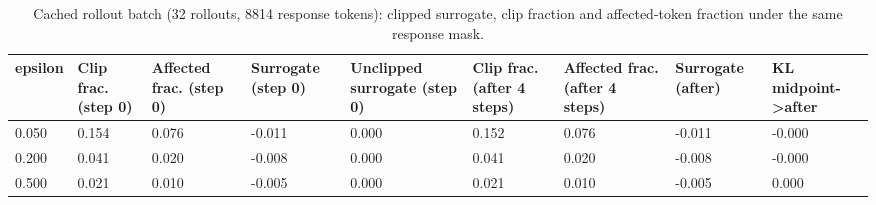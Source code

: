 \begin{table}[t]
\centering
\small
\caption{Cached rollout batch (32 rollouts, 8814 response tokens): clipped surrogate, clip fraction and affected-token fraction under the same response mask.}
\begin{tabular}{lllllllll}
\toprule
epsilon & Clip frac. (step 0) & Affected frac. (step 0) & Surrogate (step 0) & Unclipped surrogate (step 0) & Clip frac. (after 4 steps) & Affected frac. (after 4 steps) & Surrogate (after) & KL midpoint->after \\
\midrule
0.050 & 0.154 & 0.076 & -0.011 & 0.000 & 0.152 & 0.076 & -0.011 & -0.000 \\
0.200 & 0.041 & 0.020 & -0.008 & 0.000 & 0.041 & 0.020 & -0.008 & -0.000 \\
0.500 & 0.021 & 0.010 & -0.005 & 0.000 & 0.021 & 0.010 & -0.005 & 0.000 \\
\bottomrule
\end{tabular}
\end{table}
